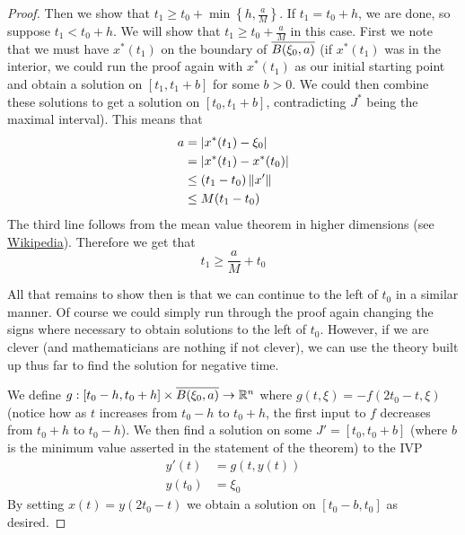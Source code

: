 \begin{proof}
Then we show that $t_1 \geq t_0 + \min \left\{ h, \frac{a}{M} \right\}$.
If $t_1 = t_0 + h$, we are done, so suppose $t_1 < t_0 + h$. We will show that $t_1 \geq t_0 + \frac{a}{M}$ in this case. First we note that we must have $x^*(t_1)$ on the boundary of $\overline{B(\xi_0, a)}$ (if $x^*(t_1)$ was in the interior, we could run the proof again with $x^*(t_1)$ as our initial starting point and obtain a solution on $[t_1, t_1 + b]$ for some $b > 0$. We could then combine these solutions to get a solution on $[t_0, t_1 + b]$, contradicting $J^*$ being the maximal interval). This means that
\begin{align*}
    a &= |x^*(t_1) - \xi_0|\\
    &= |x^*(t_1) - x^*(t_0)|\\
    &\leq (t_1 - t_0) \left\lVert x'\right\rVert\\
    &\leq M (t_1 - t_0)
\end{align*}
The third line follows from the mean value theorem in higher dimensions (see \href{https://en.wikipedia.org/wiki/Mean_value_theorem#Mean_value_theorem_in_several_variables}{Wikipedia}). Therefore we get that 
$$ t_1 \geq \frac{a}{M} + t_0 $$

All that remains to show then is that we can continue to the left of $t_0$ in a similar manner. Of course we could simply run through the proof again changing the signs where necessary to obtain solutions to the left of $t_0$. However, if we are clever (and mathematicians are nothing if not clever), we can use the theory built up thus far to find the solution for negative time. 

We define $g: [t_0 - h, t_0 + h] \times \overline{B(\xi_0, a)} \to \mathbb{R}^n$ where $g(t, \xi) = -f(2t_0 - t, \xi)$ (notice how as $t$ increases from $t_0 - h$ to $t_0 + h$, the first input to $f$ decreases from $t_0 + h$ to $t_0 - h$). We then find a solution on some $J' = [t_0, t_0 + b]$ (where $b$ is the minimum value asserted in the statement of the theorem) to the IVP
\begin{align*}
    y'(t) &= g(t, y(t))\\
    y(t_0) &= \xi_0
\end{align*}
By setting $x(t) = y(2t_0 - t)$ we obtain a solution on $[t_0 - b, t_0]$ as desired.

\end{proof}

